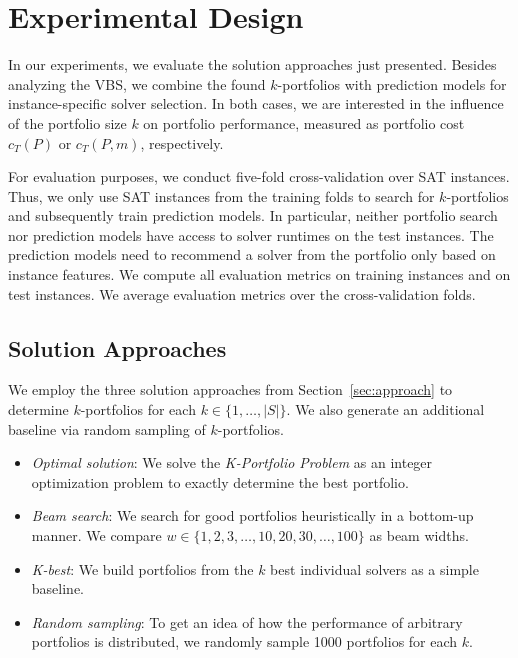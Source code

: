 \documentclass[a4paper,USenglish,pdfa]{lipics-v2021} %
\begin{document}
\section{Experimental Design}
\label{sec:experimental-design}

In our experiments, we evaluate the solution approaches just presented.
Besides analyzing the VBS, we combine the found $k$-portfolios with prediction models for instance-specific solver selection. 
In both cases, we are interested in the influence of the portfolio size $k$ on portfolio performance, measured as portfolio cost $c_T(P)$ or $c_T(P,m)$, respectively. 

For evaluation purposes, we conduct five-fold cross-validation over SAT instances.
Thus, we only use SAT instances from the training folds to search for $k$-portfolios and subsequently train prediction models.
In particular, neither portfolio search nor prediction models have access to solver runtimes on the test instances.
The prediction models need to recommend a solver from the portfolio only based on instance features.
We compute all evaluation metrics on training instances and on test instances.
We average evaluation metrics over the cross-validation folds.

\subsection{Solution Approaches}

We employ the three solution approaches from Section~\ref{sec:approach} to determine $k$-portfolios for each $k \in \{1, \dots, |S|\}$. 
We also generate an additional baseline via random sampling of $k$-portfolios.

\begin{itemize}
	\item \emph{Optimal solution}:
	We solve the \emph{K-Portfolio Problem} as an integer optimization problem to exactly determine the best portfolio.
	\item \emph{Beam search}: 
	We search for good portfolios heuristically in a bottom-up manner.
	We compare $w \in \{1, 2, 3, \dots, 10, 20, 30, \dots, 100\}$ as beam widths.
	\item \emph{K-best}:
	We build portfolios from the $k$ best individual solvers as a simple baseline.
	\item \emph{Random sampling}:
	To get an idea of how the performance of arbitrary portfolios is distributed, we randomly sample 1000 portfolios for each $k$.
\end{itemize}
\end{document}

